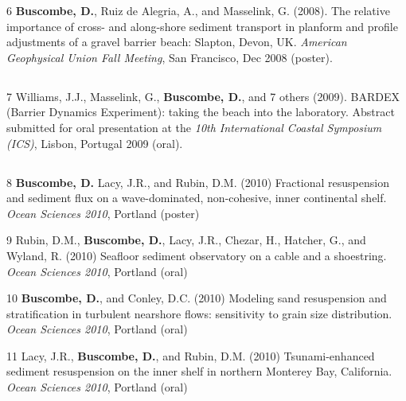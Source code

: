 \documentclass[margin,line]{resume}
\begin{document}
\begin{resume}
\begin{footnotesize}
\begin{list1}
	\item[6] {\bf Buscombe, D.}, Ruiz de Alegria, A., and Masselink, G. (2008). The relative importance of cross- and along-shore sediment transport in planform and profile adjustments of a gravel barrier beach: Slapton, Devon, UK. {\sl American Geophysical Union Fall Meeting}, San Francisco, Dec 2008 (poster).
	\end{list1}

	\subsection{}
	\begin{list1}
	\item[7] Williams, J.J., Masselink, G., {\bf Buscombe, D.}, and 7 others (2009). BARDEX (Barrier Dynamics Experiment): taking the beach into the laboratory. Abstract submitted for oral presentation at the {\sl 10th International Coastal Symposium (ICS)}, Lisbon, Portugal 2009 (oral).
	\end{list1}

	\subsection{}
	\begin{list1}
	\item[8] {\bf Buscombe, D.} Lacy, J.R., and Rubin, D.M. (2010) Fractional resuspension and sediment flux on a wave-dominated, non-cohesive, inner continental shelf. {\sl Ocean Sciences 2010}, Portland (poster)\\

	\item[9] Rubin, D.M., {\bf Buscombe, D.}, Lacy, J.R., Chezar, H., Hatcher, G., and Wyland, R. (2010) Seafloor sediment observatory on a cable and a shoestring. {\sl Ocean Sciences 2010}, Portland (oral)\\

	\item[10] {\bf Buscombe, D.}, and Conley, D.C. (2010) Modeling sand resuspension and stratification in turbulent nearshore flows: sensitivity to grain size distribution. {\sl Ocean Sciences 2010}, Portland (oral)\\

	\item[11] Lacy, J.R., {\bf Buscombe, D.}, and Rubin, D.M. (2010) Tsunami-enhanced sediment resuspension on the inner shelf in northern Monterey Bay, California. {\sl Ocean Sciences 2010}, Portland (oral)\\


\end{list1}
\end{footnotesize}
\end{resume}
\end{document}
